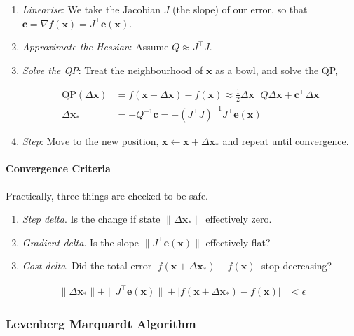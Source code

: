 \documentclass[11pt]{article}
\begin{document}
\begin{enumerate}
\item \emph{Linearise}: We take the Jacobian \(J\) (the slope) of
our error, so that \(\mathbf{c} = \nabla
   f(\mathbf{x}) = J^{\top}\mathbf{e}(\mathbf{x})\).
\item \emph{Approximate the Hessian}: Assume \(Q \approx
   J^{\top} J\).
\item \emph{Solve the QP}: Treat the neighbourhood of
\(\mathbf{x}\) as a bowl, and solve the QP,

\begin{align*}
  \mathrm{QP}(\Delta\mathbf{x})
  &= f(\mathbf{x}+\Delta\mathbf{x}) - f(\mathbf{x})
  \approx \frac12 \Delta\mathbf{x}^{\top} Q
    \Delta\mathbf{x} + \mathbf{c}^{\top}
    \Delta\mathbf{x}
  \\
  \Delta\mathbf{x}_*
  &= -Q^{-1}\mathbf{c} = -(J^{\top}J)^{-1} J^{\top}
    \mathbf{e}(\mathbf{x})
\end{align*}
\item \emph{Step}: Move to the new position, \(\mathbf{x} \gets
   \mathbf{x} + \Delta\mathbf{x}_*\) and repeat until
convergence.
\end{enumerate}
\paragraph*{Convergence Criteria}
\label{sec:orgd580548}
Practically, three things are checked to be safe.
\begin{enumerate}
\item \emph{Step delta}.  Is the change if state \(\|\Delta
   \mathbf{x}_*\|\) effectively zero.
\item \emph{Gradient delta}.  Is the slope \(\|J^{\top}
   \mathbf{e}(\mathbf{x})\|\) effectively flat?
\item \emph{Cost delta}.  Did the total error \(|f(\mathbf{x} +
   \Delta\mathbf{x}_*) - f(\mathbf{x})|\) stop decreasing?
\end{enumerate}

\begin{align*}
  \|\Delta \mathbf{x}_*\| + \|J^{\top}
  \mathbf{e}(\mathbf{x})\| + |f(\mathbf{x} +
  \Delta\mathbf{x}_*) - f(\mathbf{x})|
  &< \epsilon
\end{align*}
\subsubsection{Levenberg Marquardt Algorithm}
\label{sec:orge6c238f}
\end{document}
